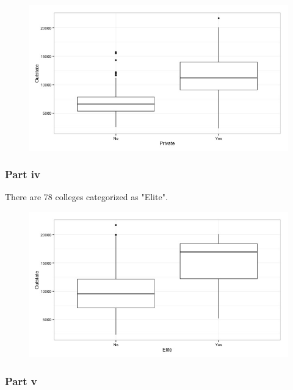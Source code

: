\documentclass[11pt]{article}
\begin{document}
\begin{figure}[H]
	\centering
	\includegraphics[width=6.5in]{8ciii.jpeg}
\end{figure}

\subsubsection*{Part iv}

There are 78 colleges categorized as "Elite".

\begin{figure}[H]
	\centering
	\includegraphics[width=6.5in]{8civ.jpeg}
\end{figure}

\subsubsection*{Part v}
\end{document}
